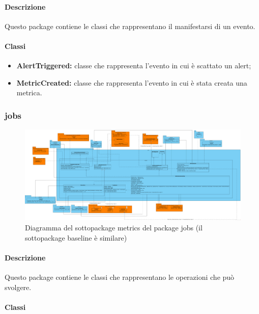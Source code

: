 		\paragraph*{Descrizione}
			Questo package contiene le classi che rappresentano il manifestarsi di un evento.
			
		\paragraph*{Classi}
			\begin{itemize}
				\item \textbf{AlertTriggered:} classe che rappresenta l'evento in cui è scattato
					un alert;
				\item \textbf{MetricCreated:} classe che rappresenta l'evento in cui è stata 
					creata una metrica.
			\end{itemize}	
			
	\subsubsection{jobs}
	
		\begin{figure}[H]
           	\centering
            \includegraphics[width=\textwidth]{./img/DiagrammiClasse/metricJob.png}
            \caption[Diagramma del sottopackage metrics]
            {Diagramma del sottopackage metrics del package jobs (il sottopackage baseline è similare)}
       	\end{figure}
		
		\paragraph*{Descrizione}
			Questo package contiene le classi che rappresentano le operazioni che \ProjectName{}
			può svolgere.
		
		\paragraph*{Classi}
		
